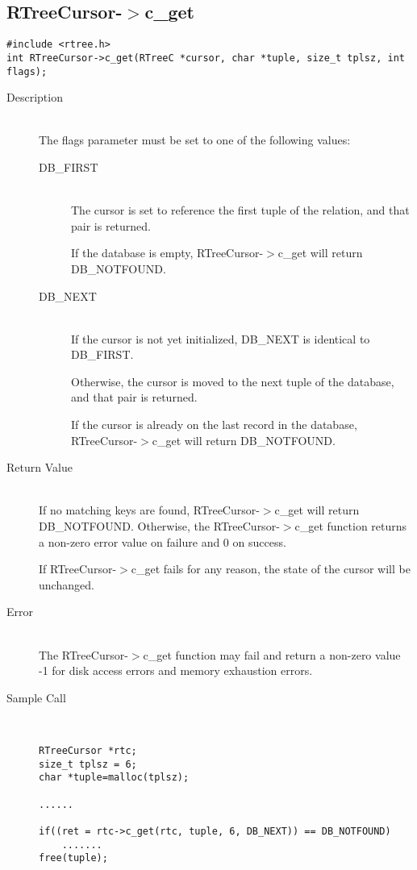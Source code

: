 \documentclass[12pt]{article}
\def\cdf{\sf }
\def\cdf{\sf }
\newcommand{\RTreeCursor}{{\small{\cdf RTreeCursor}}}
\newcommand{\DBNOTFOUND}{{\small{\cdf DB\_NOTFOUND}}}
\newcommand{\DBFIRST}{{\small{\cdf DB\_FIRST}}}
\newcommand{\DBNEXT}{{\small{\cdf DB\_NEXT}}}
\begin{document}
\subsection{{\RTreeCursor}-$>$c\_get}
\begin{verbatim}
#include <rtree.h>
int RTreeCursor->c_get(RTreeC *cursor, char *tuple, size_t tplsz, int flags);
\end{verbatim}
\begin{description}
\item[Description]\ \\

  The flags parameter must be set to one of the following values: 
  \begin{description}
  \item[{\DBFIRST}]\ \\
    The cursor is set to reference the first tuple of the relation,
    and that pair is returned.

    If the database is empty, {\RTreeCursor}-$>$c\_get will return
    {\DBNOTFOUND}.
  \item[{\DBNEXT}]\ \\
    If the cursor is not yet initialized, {\DBNEXT} is identical to
    {\DBFIRST}.

    Otherwise, the cursor is moved to the next tuple of the database,
    and that pair is returned.

    If the cursor is already on the last record in the database,
    {\RTreeCursor}-$>$c\_get will return {\DBNOTFOUND}.
  \end{description}

\item[Return Value]\ \\
   If no matching keys are found, {\RTreeCursor}-$>$c\_get will return
   {\DBNOTFOUND}.  Otherwise, the {\RTreeCursor}-$>$c\_get function
   returns a non-zero error value on failure and 0 on success.

   If {\RTreeCursor}-$>$c\_get fails for any reason, the state of the
   cursor will be unchanged.

\item[Error]\ \\ 
  The {\RTreeCursor}-$>$c\_get function may fail and return a non-zero
  value -1 for disk access errors and memory exhaustion errors.

\item[Sample Call]\ 
\begin{verbatim}
RTreeCursor *rtc;
size_t tplsz = 6;
char *tuple=malloc(tplsz);

......

if((ret = rtc->c_get(rtc, tuple, 6, DB_NEXT)) == DB_NOTFOUND)
    .......
free(tuple);
\end{verbatim}
\end{description}
\end{document}
